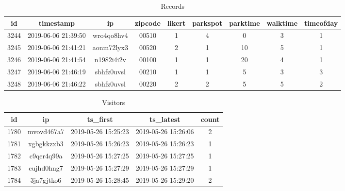 \begin{table}[!htbp] %
    \begin{centering}
        \begin{tabular}{|c c c c c c c c c|} 
            \hline
            id & timestamp & ip & zipcode & likert & parkspot & parktime & walktime & timeofday \\ [0.5ex] 
            \hline\hline
            3244 & 2019-06-06 21:39:50 & wro4qo8hv4 & 00510 & 1 & 4 & 0 & 3 & 1\\ [0.25ex]
            \hline
            3245 & 2019-06-06 21:41:21 & aonm72lyx3 & 00520 & 2 & 1 & 10 & 5 & 1 \\ [0.25ex] 
            \hline
            3246 & 2019-06-06 21:41:54 & n1982i4i2v & 00100 & 1 & 1 & 20 & 4 & 1 \\ [0.25ex] 
            \hline
            3247 & 2019-06-06 21:46:19 & sbhfz0uvsl & 00210 & 1 & 1 & 5 & 3 & 3 \\ [0.25ex] 
            \hline
            3248 & 2019-06-06 21:46:22 & sbhfz0uvsl & 00220 & 2 & 2 & 5 & 5 & 2 \\ [1ex]
            \hline
        \end{tabular}
        \caption{Records} \label{tab:recordstab}
    \end{centering}
\end{table}

\begin{table}[!htbp] %
    \begin{centering}
        \begin{tabular}{|c c c c c|} 
            \hline
            id & ip & ts\_first & ts\_latest & count \\ [0.5ex] 
            \hline\hline
            1780 & mvovd467a7 & 2019-05-26 15:25:23 & 2019-05-26 15:26:06 & 2 \\ [0.25ex] 
            \hline
            1781 & xgbgkkzxb3 & 2019-05-26 15:26:23 & 2019-05-26 15:26:23 & 1 \\ [0.25ex] 
            \hline
            1782 & c9qer4q99a & 2019-05-26 15:27:25 & 2019-05-26 15:27:25 & 1 \\ [0.25ex]
            \hline
            1783 & cujhd0hng7 & 2019-05-26 15:27:29 & 2019-05-26 15:27:29 & 1 \\ [0.25ex] 
            \hline
            1784 & 3ja7gjtko6 & 2019-05-26 15:28:45 & 2019-05-26 15:29:20 & 2 \\ [1ex]
            \hline
        \end{tabular}
        \caption{Visitors} \label{tab:visitortab}
    \end{centering}
\end{table}

